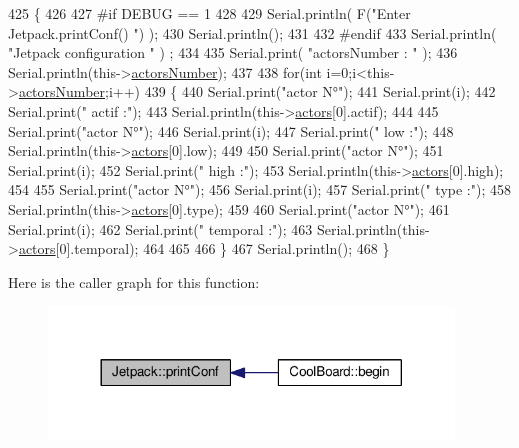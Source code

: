 \begin{DoxyCode}
425 \{
426 
427 \textcolor{preprocessor}{#if DEBUG == 1 }
428 
429     Serial.println( F(\textcolor{stringliteral}{"Enter Jetpack.printConf() "}) );
430     Serial.println();
431 
432 \textcolor{preprocessor}{#endif }
433     Serial.println( \textcolor{stringliteral}{"Jetpack configuration "} ) ;
434 
435     Serial.print( \textcolor{stringliteral}{"actorsNumber : "} );
436     Serial.println(this->\hyperlink{classJetpack_a52c86319cb3f7f1ab744a64db18a7ba5}{actorsNumber});
437  
438         \textcolor{keywordflow}{for}(\textcolor{keywordtype}{int} i=0;i<this->\hyperlink{classJetpack_a52c86319cb3f7f1ab744a64db18a7ba5}{actorsNumber};i++)
439     \{   
440         Serial.print(\textcolor{stringliteral}{"actor N°"});
441         Serial.print(i);
442         Serial.print(\textcolor{stringliteral}{" actif :"});
443         Serial.println(this->\hyperlink{classJetpack_a7e16d2f97837f9712a2e6de1c50d99db}{actors}[0].actif);
444 
445         Serial.print(\textcolor{stringliteral}{"actor N°"});
446         Serial.print(i);
447         Serial.print(\textcolor{stringliteral}{" low :"});
448         Serial.println(this->\hyperlink{classJetpack_a7e16d2f97837f9712a2e6de1c50d99db}{actors}[0].low);
449 
450         Serial.print(\textcolor{stringliteral}{"actor N°"});
451         Serial.print(i);
452         Serial.print(\textcolor{stringliteral}{" high :"});
453         Serial.println(this->\hyperlink{classJetpack_a7e16d2f97837f9712a2e6de1c50d99db}{actors}[0].high);
454 
455         Serial.print(\textcolor{stringliteral}{"actor N°"});
456         Serial.print(i);
457         Serial.print(\textcolor{stringliteral}{" type :"});
458         Serial.println(this->\hyperlink{classJetpack_a7e16d2f97837f9712a2e6de1c50d99db}{actors}[0].type);
459         
460         Serial.print(\textcolor{stringliteral}{"actor N°"});
461         Serial.print(i);
462         Serial.print(\textcolor{stringliteral}{" temporal :"});
463         Serial.println(this->\hyperlink{classJetpack_a7e16d2f97837f9712a2e6de1c50d99db}{actors}[0].temporal);
464  
465 
466     \}
467     Serial.println();
468 \}
\end{DoxyCode}
Here is the caller graph for this function\+:\nopagebreak
\begin{figure}[H]
\begin{center}
\leavevmode
\includegraphics[width=305pt]{classJetpack_ac54a7bb4f9166bee32052253d9b1d306_icgraph}
\end{center}
\end{figure}
\mbox{\label{classJetpack_a338f1af8cbc6504ac69b47c7328569b5}} 
